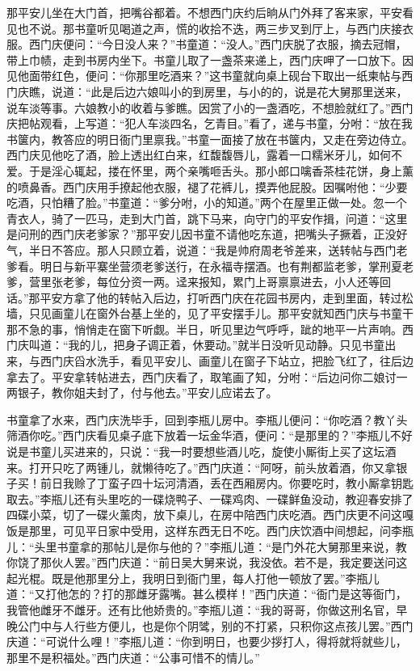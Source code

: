 那平安儿坐在大门首，把嘴谷都着。不想西门庆约后晌从门外拜了客来家，平安看见也不说。那书童听见喝道之声，慌的收拾不迭，两三步叉到厅上，与西门庆接衣服。西门庆便问：“今日没人来？”书童道：“没人。”西门庆脱了衣服，摘去冠帽，带上巾帻，走到书房内坐下。书童儿取了一盏茶来递上，西门庆呷了一口放下。因见他面带红色，便问：“你那里吃酒来？”这书童就向桌上砚台下取出一纸柬帖与西门庆瞧，说道：“此是后边六娘叫小的到房里，与小的的，说是花大舅那里送来，说车淡等事。六娘教小的收着与爹瞧。因赏了小的一盏酒吃，不想脸就红了。”西门庆把帖观看，上写道：“犯人车淡四名，乞青目。”看了，递与书童，分咐：“放在我书箧内，教答应的明日衙门里禀我。”书童一面接了放在书箧内，又走在旁边侍立。西门庆见他吃了酒，脸上透出红白来，红馥馥唇儿，露着一口糯米牙儿，如何不爱。于是淫心辄起，搂在怀里，两个亲嘴咂舌头。那小郎口噙香茶桂花饼，身上薰的喷鼻香。西门庆用手撩起他衣服，褪了花裤儿，摸弄他屁股。因嘱咐他：“少要吃酒，只怕糟了脸。”书童道：“爹分咐，小的知道。”两个在屋里正做一处。忽一个青衣人，骑了一匹马，走到大门首，跳下马来，向守门的平安作揖，问道：“这里是问刑的西门庆老爹家？”那平安儿因书童不请他吃东道，把嘴头子撅着，正没好气，半日不答应。那人只顾立着，说道：“我是帅府周老爷差来，送转帖与西门老爹看。明日与新平寨坐营须老爹送行，在永福寺摆酒。也有荆都监老爹，掌刑夏老爹，营里张老爹，每位分资一两。迳来报知，累门上哥禀禀进去，小人还等回话。”那平安方拿了他的转帖入后边，打听西门庆在花园书房内，走到里面，转过松墙，只见画童儿在窗外台基上坐的，见了平安摆手儿。那平安就知西门庆与书童干那不急的事，悄悄走在窗下听觑。半日，听见里边气呼呼，跐的地平一片声响。西门庆叫道：“我的儿，把身子调正着，休要动。”就半日没听见动静。只见书童出来，与西门庆舀水洗手，看见平安儿、画童儿在窗子下站立，把脸飞红了，往后边拿去了。平安拿转帖进去，西门庆看了，取笔画了知，分咐：“后边问你二娘讨一两银子，教你姐夫封了，付与他去。”平安儿应诺去了。

书童拿了水来，西门庆洗毕手，回到李瓶儿房中。李瓶儿便问：“你吃酒？教丫头筛酒你吃。”西门庆看见桌子底下放着一坛金华酒，便问：“是那里的？”李瓶儿不好说是书童儿买进来的，只说：“我一时要想些酒儿吃，旋使小厮街上买了这坛酒来。打开只吃了两锺儿，就懒待吃了。”西门庆道：“阿呀，前头放着酒，你又拿银子买！前日我赊了丁蛮子四十坛河清酒，丢在西厢房内。你要吃时，教小厮拿钥匙取去。”李瓶儿还有头里吃的一碟烧鸭子、一碟鸡肉、一碟鲜鱼没动，教迎春安排了四碟小菜，切了一碟火薰肉，放下桌儿，在房中陪西门庆吃酒。西门庆更不问这嘎饭是那里，可见平日家中受用，这样东西无日不吃。西门庆饮酒中间想起，问李瓶儿：“头里书童拿的那帖儿是你与他的？”李瓶儿道：“是门外花大舅那里来说，教你饶了那伙人罢。”西门庆道：“前日吴大舅来说，我没依。若不是，我定要送问这起光棍。既是他那里分上，我明日到衙门里，每人打他一顿放了罢。”李瓶儿道：“又打他怎的？打的那雌牙露嘴。甚么模样！”西门庆道：“衙门是这等衙门，我管他雌牙不雌牙。还有比他娇贵的。”李瓶儿道：“我的哥哥，你做这刑名官，早晚公门中与人行些方便儿，也是你个阴骘，别的不打紧，只积你这点孩儿罢。”西门庆道：“可说什么哩！”李瓶儿道：“你到明日，也要少拶打人，得将就将就些儿，那里不是积福处。”西门庆道：“公事可惜不的情儿。”


